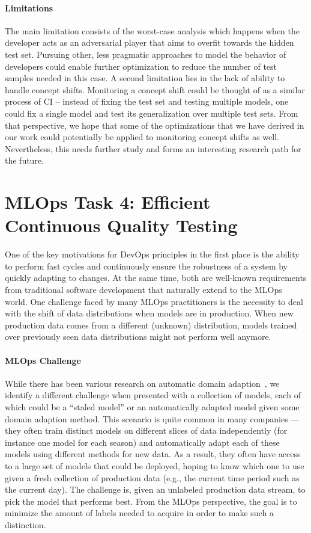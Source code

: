 \documentclass[11pt]{article}
\begin{document}
\paragraph{Limitations}

The main limitation consists of the worst-case analysis which happens when the developer acts as an adversarial player that aims to overfit towards the hidden test set. Pursuing other, less pragmatic approaches to model the behavior of developers could enable further optimization to reduce the number of test samples needed in this case.
A second limitation lies in the lack of ability to handle concept shifts. Monitoring a concept shift could be thought of as a similar process of CI -- instead of fixing the test set and testing multiple models, one could fix a single model and test its generalization over multiple test sets. From that perspective, we hope that some of the optimizations that we have derived in our work could potentially be applied to monitoring concept shifts as well. Nevertheless, this needs further study and forms an interesting research path for the future.

\section{MLOps Task 4: Efficient Continuous Quality Testing}
\label{sec:model_picker}

One of the key motivations for DevOps principles in the first place is the ability to perform fast cycles and continuously ensure the robustness of a system by quickly adapting to changes. At the same time, both are well-known requirements from traditional software development that naturally extend to the MLOps world.
One challenge faced by many MLOps practitioners is the necessity
to deal with the shift of data distributions when models are
in production. When new production 
data comes from a different (unknown) distribution,
models trained over previously seen 
data distributions might not perform well
anymore. 

\paragraph*{MLOps Challenge}
While there has been various research on 
automatic domain adaption~\cite{shimodaira2000improving, sugiyama2008direct, zhang2013domain}, we identify a 
different challenge when presented with a collection of models, each of which could be a ``staled model'' or 
an automatically adapted model given some domain adaption method. 
This scenario is quite common in many 
companies --- they often train distinct models on
different slices of data independently (for instance one model for each season) and 
automatically adapt each of these
models using different methods for new data. As a result,
they often have access to a large 
set of models that could be deployed, hoping to know which one to use given
a fresh collection of production data (e.g., the current time period such as the current day).
The challenge is, given an unlabeled 
production data stream, to pick the model that
performs best. From the MLOps perspective,
the goal is to minimize the amount of labels needed to 
acquire in order to make such a distinction. 
\end{document}
